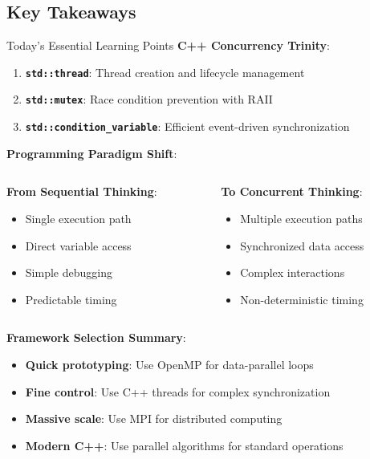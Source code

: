 \subsection{Key Takeaways}
\begin{frame}[fragile]{ Today's Essential Learning Points}
	\textbf{C++ Concurrency Trinity}:
	\begin{enumerate}
		\item \textbf{\texttt{std::thread}}: Thread creation and lifecycle management
		\item \textbf{\texttt{std::mutex}}: Race condition prevention with RAII
		\item \textbf{\texttt{std::condition\_variable}}: Efficient event-driven synchronization
	\end{enumerate}

	\vspace{1em}
	\textbf{Programming Paradigm Shift}:
	\begin{columns}
		\begin{column}{0.5\textwidth}
			\textbf{From Sequential Thinking}:
			\begin{itemize}
				\item Single execution path
				\item Direct variable access
				\item Simple debugging
				\item Predictable timing
			\end{itemize}
		\end{column}
		\begin{column}{0.5\textwidth}
			\textbf{To Concurrent Thinking}:
			\begin{itemize}
				\item Multiple execution paths
				\item Synchronized data access
				\item Complex interactions
				\item Non-deterministic timing
			\end{itemize}
		\end{column}
	\end{columns}

	\vspace{1em}
	\textbf{Framework Selection Summary}:
	\begin{itemize}
		\item \textbf{Quick prototyping}: Use OpenMP for data-parallel loops
		\item \textbf{Fine control}: Use C++ threads for complex synchronization
		\item \textbf{Massive scale}: Use MPI for distributed computing
		\item \textbf{Modern C++}: Use parallel algorithms for standard operations
	\end{itemize}
\end{frame}

